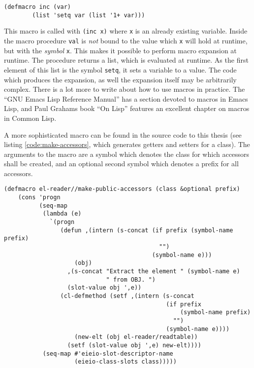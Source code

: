 \documentclass[a4paper,10pt,twoside]{report}
\newcommand{\el}{Emacs Lisp}
\newcommand{\cl}{Common Lisp}
\newcommand{\sym}[1]{\texttt{#1}}
\begin{document}
\begin{lstlisting}[style=lispcode,caption={Increment as a
      macro.},label={code:increment}]
  (defmacro inc (var)
        (list 'setq var (list '1+ var)))
\end{lstlisting}

This macro is called with \texttt{(inc x)} where \sym{x} is an already existing
variable.  Inside the macro procedure \sym{val} is \emph{not} bound to the value
which \sym{x} will hold at runtime, but with the \emph{symbol} \sym{x}.  This
makes it possible to perform macro expansion at runtime.  The procedure returns
a list, which is evaluated at runtime.  As the first element of this list is the
symbol \sym{setq}, it sets a variable to a value.  The code which produces the
expansion, as well the expansion itself may be arbitrarily complex.  There is a
lot more to write about how to use macros in practice.  The ``GNU Emacs Lisp
Reference Manual'' has a section devoted to macros in \el, and Paul Grahams book
``On Lisp'' \cite{on-lisp} features an excellent chapter on macros in \cl{}.

A more sophisticated macro can be found in the source code to this thesis (see
listing \ref{code:make-accessors}, which generates getters and setters for a
class).  The arguments to the macro are a symbol which denotes the class for
which accessors shall be created, and an optional second symbol which denotes a
prefix for all accessors.

\begin{lstlisting}[style=lispcode,caption={Create accessors for all data members
  of a given class.},label={code:make-accessors}]
(defmacro el-reader//make-public-accessors (class &optional prefix)
    (cons 'progn
          (seq-map
           (lambda (e)
             `(progn
                (defun ,(intern (s-concat (if prefix (symbol-name prefix)
                                            "")
                                          (symbol-name e)))
                    (obj)
                  ,(s-concat "Extract the element " (symbol-name e)
                             " from OBJ. ")
                  (slot-value obj ',e))
                (cl-defmethod (setf ,(intern (s-concat
                                              (if prefix
                                                  (symbol-name prefix)
                                                "")
                                              (symbol-name e))))
                    (new-elt (obj el-reader/readtable))
                  (setf (slot-value obj ',e) new-elt))))
           (seq-map #'eieio-slot-descriptor-name
                    (eieio-class-slots class)))))
\end{lstlisting}
\end{document}
